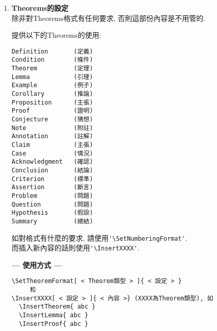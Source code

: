 \begin{enumerate}
{\newpage
    目錄中章節號碼跟章節題目中的分隔符號\\
    正常在目錄中會顯示 'Chapter 1. ABCDEF' 或 '第一章. ABCDEF'\\
    但因個人喜好, 做法不一樣,\\
    如 'Chapter 1: ABCDEF' 或 '第一章 ABCDEF'\\
    故使用 SepAtIndex 可設定你想要的符號或不需要符號
    \begin{DescriptionFrame}
    \begin{verbatim}
如想換'章'的由'Chapter 1. ABCDEF'換成'Chapter 1: ABCDEF'
則使用
  \SetNumberingFormat[Chapter]{%
    SepAtIndex = {:},%
   }%

如想換'章'的由'第一章. ABCDEF'換成'第一章 ABCDEF'
  \SetNumberingFormat[Chapter]{%
    BeginText = {第}, EndText = {章},%
    CNumStyle = {ChiNum},%
    SepAtIndex = {},%
  }%
    \end{verbatim}
    \end{DescriptionFrame}
  } %

  \newpage
  \item
  {
    \textbf{Theorems的設定}\\
    除非對Theorems格式有任何要求, 否則這部份內容是不用管的.

    提供以下的Theorems的使用:
    \begin{DescriptionFrame}
    \begin{verbatim}
Definition       (定義)
Condition        (條件)
Theorem          (定理)
Lemma            (引理)
Example          (例子)
Corollary        (推論)
Proposition      (主張)
Proof            (證明)
Conjecture       (猜想)
Note             (附註)
Annotation       (註解)
Claim            (主張)
Case             (情況)
Acknowledgment   (確認)
Conclusion       (結論)
Criterion        (標準)
Assertion        (斷言)
Problem          (問題)
Question         (問題)
Hypothesis       (假設)
Summary          (總結)
    \end{verbatim}
    \end{DescriptionFrame}

    如對格式有什麼的要求, 請使用\verb|'\SetNumberingFormat'|.\\
    而插入新內容的話則使用\verb|'\InsertXXXX'|.

  \newpage
    \textbf{--- 使用方式 ---}
    \begin{DescriptionFrame}
    \begin{verbatim}
\SetTheoremFormat[ < Theorem類型 > ]{ < 設定 > }
     和
\InsertXXXX[ < 設定 > ]{ < 內容 >} (XXXX為Theorem類型), 如
  \InsertTheorem{ abc }
  \InsertLemma{ abc }
  \InsertProof{ abc }
    \end{verbatim}
    \end{DescriptionFrame}

}
\end{enumerate}
